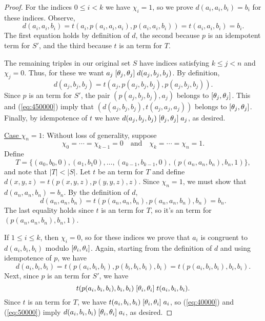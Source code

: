 \begin{proof}
For the indices $0\leq i < k$ we have $\chi_i =1$, so we prove
$d(a_i,a_i,b_i) = b_i$ for these indices. Observe,
\[
  d(a_i,a_i,b_i) =
  t(a_i, p(a_i,a_i,a_i), p(a_i,a_i,b_i)) %
  =t(a_i, a_i, b_i) %
  =b_i. %
\]
The first equation holds by definition of $d$, the second
because $p$ is an idempotent \ld term for
$S'$, and the third because $t$ is an \ld term for $T$.

The remaining triples in our original set $S$
have indices satisfying $k\leq j < n$ and $\chi_j = 0$.
Thus, for these we want
$a_j \mathrel{[\theta_j, \theta_j]} d(a_j,b_j,b_j)$.
By definition,
\begin{equation}
  \label{eq:450000}
d(a_j,b_j,b_j) =t(a_j, p(a_j,b_j,b_j), p(a_j,b_j,b_j)).
\end{equation}
Since $p$ is an \ld term for $S'$, %
the pair $(p(a_j,b_j,b_j), a_j)$ belongs to $[\theta_j, \theta_j]$.
This and
(\ref{eq:450000}) imply
that
$(d(a_j, b_j,b_j), t(a_j,a_j,a_j))$
belongs to
$[\theta_j, \theta_j]$.
Finally, by idempotence of $t$ we have
$d(a_j,b_j,b_j)\mathrel{[\theta_j, \theta_j]} a_j$,
as desired.

\medskip
\noindent \underline{Case $\chi_n = 1$}:
Without loss of generality, suppose 
\begin{equation*}
  \chi_0 =\cdots =\chi_{k-1} = 0 
  \quad \text{and} \quad
\chi_{k} = \cdots = \chi_{n} = 1.
\end{equation*}
Define
\begin{equation*}
T = \{(a_0, b_0, 0), (a_1, b_1 0), \dots, (a_{k-1}, b_{k-1}, 0), 
        (p(a_n, a_n, b_n), b_n, 1)\},
\end{equation*}
and note that $|T| < |S|$.
Let $t$ be an \ld term for $T$ and define
$d(x,y,z) = t(p(x,y,z), p(y,y,z), z)$.
Since $\chi_n =1$, we must show that
$d(a_n,a_n,b_n) = b_n$. By the definition of $d$,
\begin{equation*}  
  d(a_n,a_n,b_n) =
  t(p(a_n,a_n,b_n), p(a_n,a_n,b_n), b_n) =b_n.
\end{equation*}
The last equality holds since $t$ is an \ld term for $T$, so it's 
an \ld term for $(p(a_n, a_n, b_n), b_n, 1)$.

If $1\leq i \leq k$, then $\chi_i =0$, so for these indices we prove
that $a_i$ is congruent to $d(a_i,b_i,b_i)$ modulo $[\theta_i, \theta_i]$.
Again, starting from the definition of $d$ and using idempotence of $p$, we have
\begin{equation}
  \label{eq:40000}
  d(a_i,b_i,b_i) =
  t(p(a_i,b_i,b_i), p(b_i,b_i,b_i), b_i)=
  t(p(a_i,b_i,b_i), b_i, b_i).
\end{equation}
Next, since $p$ is an \ld term for $S'$, we have
\begin{equation}
  \label{eq:50000}
  t(p(a_i,b_i,b_i), b_i, b_i)
 \mathrel{[\theta_i, \theta_i]}
 t(a_i, b_i, b_i).
\end{equation}
Since $t$ is an \ld term for $T$, 
we have
$t(a_i, b_i, b_i) \mathrel{[\theta_i, \theta_i]} a_i$, so 
(\ref{eq:40000}) and (\ref{eq:50000}) imply
$d(a_i,b_i,b_i) \mathrel{[\theta_i, \theta_i]} a_i$, as desired.


\end{proof}
